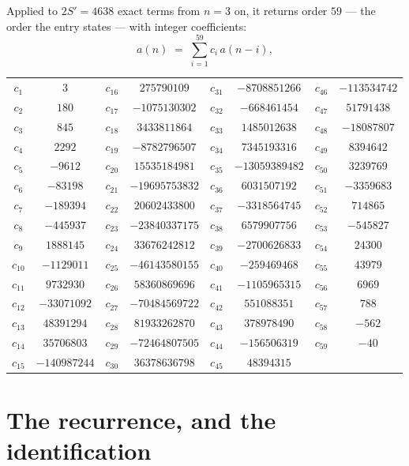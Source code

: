 \documentclass[11pt,a4paper]{article}
\theoremstyle{plain}
\theoremstyle{definition}
\begin{document}
Applied to $2S'=4638$ exact terms from $n=3$ on, it returns order $59$ --- the
order the entry states --- with integer coefficients:
\[
a(n)\;=\;\sum_{i=1}^{59}c_i\,a(n-i),
\]
\begin{center}\small
\begin{tabular}{cccccccc}
$c_{1}$ & $3$ & $c_{16}$ & $275790109$ & $c_{31}$ & $-8708851266$ & $c_{46}$ & $-113534742$ \\
$c_{2}$ & $180$ & $c_{17}$ & $-1075130302$ & $c_{32}$ & $-668461454$ & $c_{47}$ & $51791438$ \\
$c_{3}$ & $845$ & $c_{18}$ & $3433811864$ & $c_{33}$ & $1485012638$ & $c_{48}$ & $-18087807$ \\
$c_{4}$ & $2292$ & $c_{19}$ & $-8782796507$ & $c_{34}$ & $7345193316$ & $c_{49}$ & $8394642$ \\
$c_{5}$ & $-9612$ & $c_{20}$ & $15535184981$ & $c_{35}$ & $-13059389482$ & $c_{50}$ & $3239769$ \\
$c_{6}$ & $-83198$ & $c_{21}$ & $-19695753832$ & $c_{36}$ & $6031507192$ & $c_{51}$ & $-3359683$ \\
$c_{7}$ & $-189394$ & $c_{22}$ & $20602433800$ & $c_{37}$ & $-3318564745$ & $c_{52}$ & $714865$ \\
$c_{8}$ & $-445937$ & $c_{23}$ & $-23840337175$ & $c_{38}$ & $6579907756$ & $c_{53}$ & $-545827$ \\
$c_{9}$ & $1888145$ & $c_{24}$ & $33676242812$ & $c_{39}$ & $-2700626833$ & $c_{54}$ & $24300$ \\
$c_{10}$ & $-1129011$ & $c_{25}$ & $-46143580155$ & $c_{40}$ & $-259469468$ & $c_{55}$ & $43979$ \\
$c_{11}$ & $9732930$ & $c_{26}$ & $58360869696$ & $c_{41}$ & $-1105965315$ & $c_{56}$ & $6969$ \\
$c_{12}$ & $-33071092$ & $c_{27}$ & $-70484569722$ & $c_{42}$ & $551088351$ & $c_{57}$ & $788$ \\
$c_{13}$ & $48391294$ & $c_{28}$ & $81933262870$ & $c_{43}$ & $378978490$ & $c_{58}$ & $-562$ \\
$c_{14}$ & $35706803$ & $c_{29}$ & $-72464807505$ & $c_{44}$ & $-156506319$ & $c_{59}$ & $-40$ \\
$c_{15}$ & $-140987244$ & $c_{30}$ & $36378636798$ & $c_{45}$ & $48394315$ &  &  \\
\end{tabular}
\end{center}

\section{The recurrence, and the identification}
\end{document}
